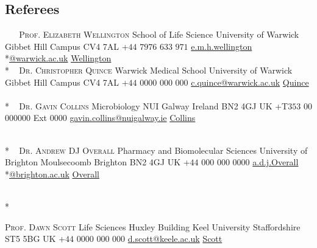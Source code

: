 \documentclass[hidelinks]{james-cv} %
\begin{document}
\begin{aside1}
\color{gray}\headingfontcontact
\section{Referees}
~
~
\normalsize\color{gray}\bodyfontsc\textsc{Prof. Elizabeth Wellington}
\bodyfontcontact\normalsize
School of Life Science
University of Warwick
Gibbet Hill Campus
CV4 7AL
+$44$ $7976$ $633$ $971$ \Phone
\footnotesize\mail\href{mailto:e.m.h.wellington@warwick.ac.uk}{e.m.h.wellington}\\*\href{mailto:e.m.h.wellington@warwick.ac.uk}{@warwick.ac.uk} \Envelope
\color{blue}\href{https://warwick.ac.uk/fac/sci/lifesci/research/wrg/} {Wellington}
~
\\*
~
\color{gray}\normalsize\bodyfontsc\textsc{Dr. Christopher Quince}
\bodyfontcontact\normalsize
Warwick Medical School
University of Warwick
Gibbet Hill Campus
CV4 7AL
+$44$ $0000$ $000$ $000$ \Phone
\footnotesize\mail\href{mailto:c.quince@warwick.ac.uk}{c.quince@warwick.ac.uk} \Envelope 
\color{blue}\href{https://warwick.ac.uk/fac/sci/med/staff/cquince/}{Quince}
~
\\*
~
\color{gray}\normalsize\bodyfontsc\textsc{Dr. Gavin Collins}
\bodyfontcontact\normalsize
Microbiology
NUI Galway
Ireland
BN2 4GJ
UK
+T$353$ $00$ $000000$ Ext $0000$ \Phone
\footnotesize\mail\href{mailto:gavin.collins@nuigalway.ie}{gavin.collins@nuigalway.ie} \Envelope 
\color{blue}\href{https://www.nuigalway.ie/our-research/people/natural-sciences/gavincollins/}{Collins}

~
\\*
~
\color{gray}\normalsize\bodyfontsc\textsc{Dr. Andrew DJ Overall}
\bodyfontcontact\normalsize
Pharmacy and Biomolecular Sciences
University of Brighton
Moulsecoomb
Brighton
BN2 4GJ
UK
+$44$ $000$ $000$ $0000$ \Phone
\footnotesize\mail\href{mailto:A.D.J.Overall@brighton.ac.uk}{a.d.j.Overall}\\*\href{mailto:A.D.J.Overall@brighton.ac.uk}{@brighton.ac.uk} \Envelope
\color{blue}\href{https://research.brighton.ac.uk/en/persons/andrew-overall}{Overall}

~
\\*
~

\color{gray}\bodyfontsc\normalsize\textsc{Prof. Dawn Scott}
\bodyfontcontact\normalsize
Life Sciences
Huxley Building
Keel University
Staffordshire
ST5 5BG
UK
+$44$ $0000$ $000$ $000$ \Phone
\footnotesize\mail\href{mailto:d.scott@keele.ac.uk}{d.scott@keele.ac.uk} \Envelope
\color{blue}\href{https://www.keele.ac.uk/lifesci/ourpeople/dawnscott/}{Scott}

\end{aside1}
\end{document}

